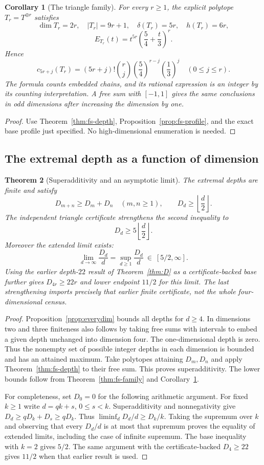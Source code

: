 \documentclass[manuscript]{aomart}
\newtheorem{theorem}{Theorem}
\newtheorem{corollary}[theorem]{Corollary}
\theoremstyle{definition}
\theoremstyle{remark}
\begin{document}
\begin{corollary}[The triangle family]\label{cor:fs-triangle}
For every $r\ge1$, the explicit polytope $T_r=T^{\oplus r}$ satisfies
\[
 \dim T_r=2r,\quad |T_r|=9r+1,\quad
 \delta(T_r)=5r,\quad h(T_r)=6r,
\]
\[
 E_{T_r}(t)=t^{5r}\left(\frac54+\frac t3\right)^r.
\]
Hence
\[
 c_{5r+j}(T_r)=(5r+j)!\binom rj
                  \left(\frac54\right)^{r-j}\left(\frac13\right)^j
 \quad(0\le j\le r).
\]
The formula counts embedded chains, and its rational expression is an
integer by its counting interpretation. A free sum with $[-1,1]$ gives
the same conclusions in odd dimensions after increasing the dimension by one.
\end{corollary}
\begin{proof}
Use Theorem~\ref{thm:fs-depth}, Proposition~\ref{prop:fs-profile}, and
the exact base profile just specified. No high-dimensional enumeration
is needed.
\end{proof}

\subsection{The extremal depth as a function of dimension}
\begin{theorem}[Superadditivity and an asymptotic limit]\label{thm:fs-growth}
The extremal depths are finite and satisfy
\[
 D_{m+n}\ge D_m+D_n\quad(m,n\ge1),\qquad
 D_d\ge\left\lfloor\frac d2\right\rfloor.
\]
The independent triangle certificate strengthens the second inequality to
\[
 D_d\ge5\left\lfloor\frac d2\right\rfloor.
\]
Moreover the extended limit exists:
\[
 \lim_{d\to\infty}\frac{D_d}{d}
 =\sup_{d\ge1}\frac{D_d}{d}\ \in\ [5/2,\infty].
\]
Using the earlier depth-$22$ result of Theorem~\ref{thm:D} as a
certificate-backed base further gives $D_{4r}\ge22r$ and lower endpoint
$11/2$ for this limit. The last strengthening imports precisely that
earlier finite certificate, not the whole four-dimensional census.
\end{theorem}
\begin{proof}
Proposition~\ref{prop:everydim} bounds all depths for $d\ge4$.
In dimensions two and three finiteness also follows by taking free sums
with intervals to embed a given depth unchanged into dimension four.
The one-dimensional depth is zero. Thus the nonempty set of possible
integer depths in each dimension is bounded and has an attained maximum.
Take polytopes attaining $D_m,D_n$ and apply Theorem~\ref{thm:fs-depth}
to their free sum. This proves superadditivity. The lower bounds follow
from Theorem~\ref{thm:fs-family} and Corollary~\ref{cor:fs-triangle}.

For completeness, set $D_0=0$ for the following arithmetic argument.
For fixed $k\ge1$ write $d=qk+s$, $0\le s<k$. Superadditivity and
nonnegativity give $D_d\ge qD_k+D_s\ge qD_k$. Thus
$\liminf_dD_d/d\ge D_k/k$. Taking the supremum over $k$ and observing
that every $D_d/d$ is at most that supremum proves the equality of
extended limits, including the case of infinite supremum. The base
inequality with $k=2$ gives $5/2$. The same argument with the
certificate-backed $D_4\ge22$ gives $11/2$ when that earlier result is used.
\end{proof}
\end{document}

